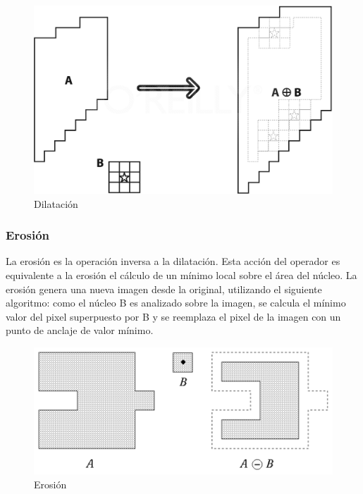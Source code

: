 \begin{figure}[hbtp]

\centering
\includegraphics[scale=0.3]{imagenes/erosion-model.png}
\caption{Dilatación}
\end{figure}


\subsubsection{Erosión}
La erosión es la operación inversa a la dilatación. Esta acción del operador es equivalente a la erosión el cálculo de un mínimo local sobre el área del núcleo. La erosión genera una nueva imagen desde la original, utilizando el siguiente algoritmo: como el núcleo B es analizado sobre la imagen, se calcula el mínimo valor del pixel superpuesto por B y se reemplaza el pixel de la imagen con un punto de anclaje de valor mínimo. \cite{BookOpenCv}

\begin{figure}[hbtp]

\centering
\includegraphics[scale=1]{imagenes/erosion.png}
\caption{Erosión}
\end{figure}
